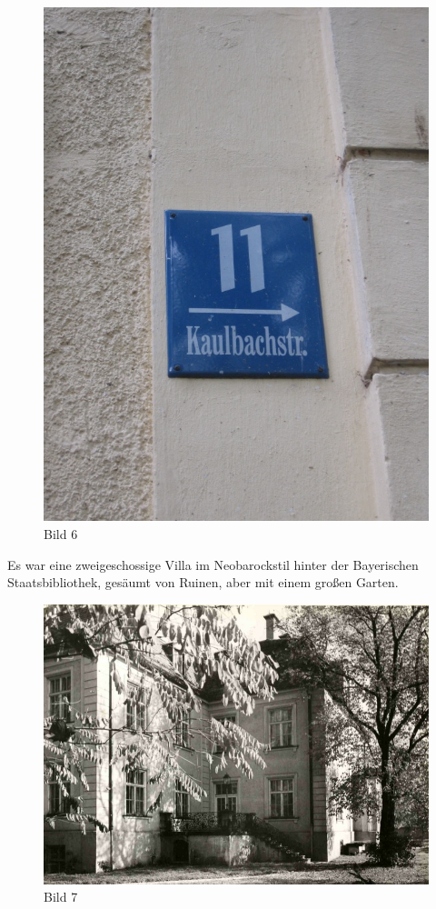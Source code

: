 \documentclass[a4paper,
fontsize=11pt,
oneside,
numbers=noperiodatend,
parskip=half-,
bibliography=totoc,
final
]{scrartcl}
\begin{document}
\begin{figure}[htbp]
\centering
\includegraphics{img/Bild6.jpg}
\caption{Bild 6}
\end{figure}

Es war eine zweigeschossige Villa im Neobarockstil hinter der
Bayerischen Staatsbibliothek, gesäumt von Ruinen, aber mit einem großen
Garten.

\begin{figure}[htbp]
\centering
\includegraphics{img/Bild7.jpg}
\caption{Bild 7}
\end{figure}
\end{document}
